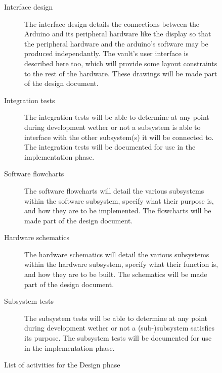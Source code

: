 \begin{figure}
\caption{List of activities for the Design phase}
\begin{description}
\item[Interface design] The interface design details the connections between the Arduino and its peripheral hardware like the display so that the peripheral hardware and the arduino's software may be produced independantly. The vault's user interface is described here too, which will provide some layout constraints to the rest of the hardware. These drawings will be made part of the design document.
\item[Integration tests] The integration tests will be able to determine at any point during development wether or not a subsystem is able to interface with the other subsystem(s) it will be connected to. The integration tests will be documented for use in the implementation phase.
\item[Software flowcharts] The software flowcharts will detail the various subsystems within the software subsystem, specify what their purpose is, and how they are to be implemented. The flowcharts will be made part of the design document.
\item[Hardware schematics] The hardware schematics will detail the various subsystems within the hardware subsystem, specify what their function is, and how they are to be built. The schematics will be made part of the design document.
\item[Subsystem tests] The subsystem tests will be able to determine at any point during development wether or not a (sub-)subsystem satisfies its purpose. The subsystem tests will be documented for use in the implementation phase.
\end{description}
\label{lst:designactivities}
\end{figure}

